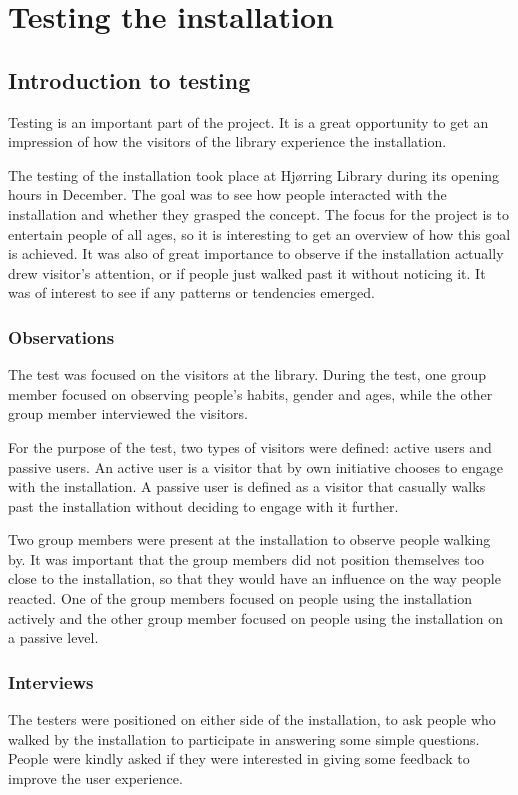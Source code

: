 \chapter{Testing the installation}
\section{Introduction to testing}
Testing is an important part of the project. It is a great opportunity to get an impression of how the visitors of the library experience the installation.


The testing of the installation took place at Hj{\o}rring Library during its opening hours in December. The goal was to see how people interacted with the installation and whether they grasped the concept. The focus for the project is to entertain people of all ages, so it is interesting to get an overview of how this goal is achieved. It was also of great importance to observe if the installation actually drew visitor's attention, or if people just walked past it without noticing it. It was of interest to see if any patterns or tendencies emerged.

\subsection{Observations}
The test was focused on the visitors at the library. During the test, one group member focused on observing people's habits, gender and ages, while the other group member interviewed the visitors.

For the purpose of the test, two types of visitors were defined: active users and passive users. An active user is a visitor that by own initiative chooses to engage with the installation. A passive user is defined as a visitor that casually walks past the installation without deciding to engage with it further.

Two group members were present at the installation to observe people walking by. It was important that the group members did not position themselves too close to the installation, so that they would have an influence on the way people reacted. One of the group members focused on people using the installation actively and the other group member focused on people using the installation on a passive level.\\

\subsection{Interviews}
The testers were positioned on either side of the installation, to ask people who walked by the installation to participate in answering some simple questions. People were kindly asked if they were interested in giving some feedback to improve the user experience.


